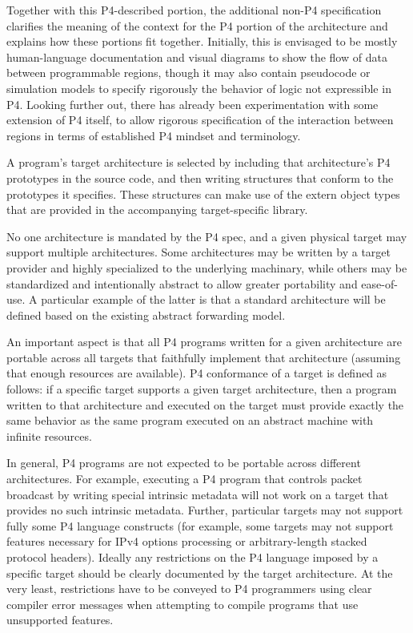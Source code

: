 \documentclass[12pt]{article}
\begin{document}
Together with this P4-described portion, the additional non-P4
specification clarifies the meaning of the context for the P4 portion of
the architecture and explains how these portions fit together.  Initially, this
is envisaged to be mostly human-language documentation and visual diagrams to
show the flow of data between programmable regions, though it may also
contain pseudocode or simulation models to specify rigorously the behavior of
logic not expressible in P4.  Looking further out, there has already been
experimentation with some extension of P4 itself, to allow rigorous
specification of the interaction between regions in terms of established
P4 mindset and terminology.


A program's target architecture is selected by including that architecture's P4
prototypes in the source code, and then writing structures that conform to the
prototypes it specifies.  These structures can make use of the extern object
types that are provided in the accompanying target-specific library.

No one architecture is mandated by the P4 spec, and a given physical target may 
support multiple architectures.  Some architectures may be written by a target
provider and highly specialized to the underlying machinary, while others may
be standardized and intentionally abstract to allow greater portability and
ease-of-use.  A particular example of the latter is that a standard
architecture will be defined based on the existing abstract forwarding model.

An important aspect is that all P4 programs written for a given architecture
are portable across all targets that faithfully implement that architecture
(assuming that enough resources are available).  P4 conformance of a target is
defined as follows: if a specific target supports a given target architecture,
then a program written to that architecture and executed on the target must
provide exactly the same behavior as the same program executed on an abstract
machine with infinite resources.

In general, P4 programs are not expected to be portable across different
architectures.  For example, executing a P4 program that controls packet
broadcast by writing special intrinsic metadata will not work on a target that
provides no such intrinsic metadata.  Further, particular targets may not
support fully some P4 language constructs (for example, some targets may not
support features necessary for IPv4 options processing or arbitrary-length
stacked protocol headers).  Ideally any restrictions on the P4 language
imposed by a specific target should be clearly documented by the target
architecture.  At the very least, restrictions have to be conveyed to P4
programmers using clear compiler error messages when attempting to compile
programs that use unsupported features.
\end{document}
